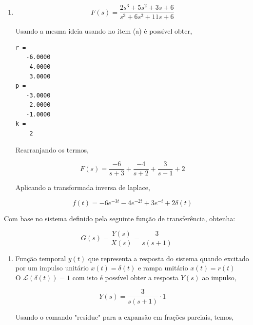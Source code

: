 \documentclass[a4paper, 10pt]{article}
\begin{document}
\begin{list}{\textbf{Questão .}}{
\setlength{\labelwidth}{-2mm} \setlength{\parsep}{0mm}
\setlength{\topsep}{0mm} \setlength{\leftmargin}{0mm}}
\begin{enumerate}
        Usando a mesma ideia usando no item (a) é possível obter, 

        \begin{lstlisting}
r = []
p = []
k = []
    \end{lstlisting}


    \item

        $$
        F(s) = \frac{2 s^3 + 5 s^2 + 3 s + 6}{s^3 + 6 s^2 + 11 s + 6}
        $$

        Usando a mesma ideia usando no item (a) é possível obter, 

        \begin{lstlisting}
r = 
   -6.0000
   -4.0000
    3.0000
p = 
   -3.0000
   -2.0000
   -1.0000
k = 
    2
    \end{lstlisting}


        Rearranjando os termos, 

        $$
        F(s) = \frac{-6}{s+3} + \frac{-4}{s+2} + \frac{3}{s+1} + 2
        $$

        Aplicando a transformada inversa de laplace,

        $$
        f(t) = -6 e^{-3t} -4 e^{-2t} + 3 e^{-t} + 2 \delta(t)
        $$

    \end{enumerate}











\item 
    Com base no sistema definido pela seguinte função de transferência, obtenha:

    $$
    G(s) = \frac{Y(s)}{X(s)} = \frac{3}{s(s+1)}
    $$
    \begin{enumerate}
        \item
            Função temporal $y(t)$ que representa a resposta do sistema quando excitado
            por um impulso unitário $x(t)=\delta(t)$ e rampa unitário $x(t)=r(t)$ \\

            O $\mathcal{L}(\delta(t)) = 1$ com isto é possível obter a resposta 
            $Y(s)$ ao impulso, 
    
            $$
                Y(s) = \frac{3}{s(s+1)} \cdot 1
            $$

            Usando o comando "residue" para a expansão em frações parciais, temos,


\end{enumerate}
\end{list}
\end{document}
